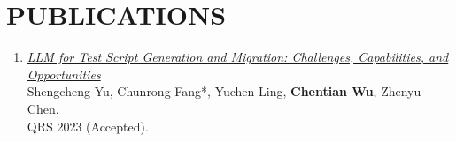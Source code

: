 \section*{PUBLICATIONS}
\begin{enumerate}[itemsep=0.3em, leftmargin=0em, label={}]
    \item \href{https://arxiv.org/abs/2309.13574}{\emph{LLM for Test Script Generation and Migration: Challenges, Capabilities, and Opportunities}}\\
    Shengcheng Yu, Chunrong Fang*, Yuchen Ling, \textbf{Chentian Wu}, Zhenyu Chen.\\
    QRS 2023 (Accepted).
\end{enumerate}